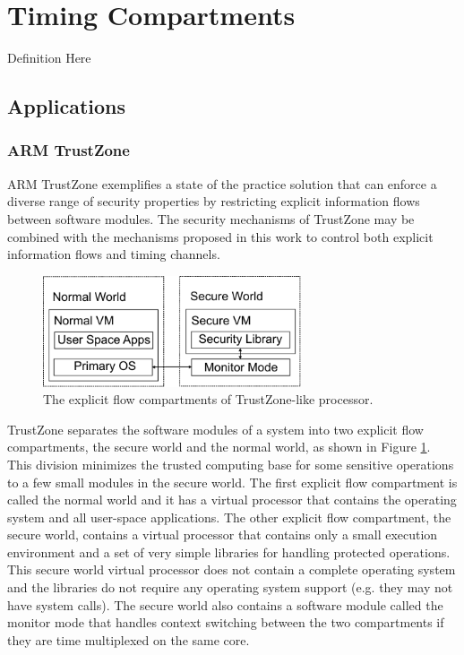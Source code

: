 \section{Timing Compartments}
    Definition Here
    \subsection{ Applications }
    \subsubsection{ARM TrustZone}
    ARM TrustZone exemplifies a state of the practice solution that can enforce 
    a diverse range of security properties by restricting explicit information 
    flows between software modules. The security mechanisms of TrustZone may be 
    combined with the mechanisms proposed in this work to control both explicit 
    information flows and timing channels.

    \begin{figure}
        \begin{center}
            \includegraphics[width=3in]{figs/worlds.pdf}
            \caption{The explicit flow compartments of TrustZone-like 
            processor.}
            \label{fig:tz_domains}
        \end{center}
    \end{figure}

    TrustZone separates the software modules of a system into two explicit flow 
    compartments, the secure world and the normal world, as shown in Figure 
    \ref{fig:tz_domains}.
    This division minimizes the trusted computing base for some sensitive
    operations to a few small modules in the secure world.
    The first explicit flow compartment is called the normal world and it has a 
    virtual processor that contains the operating system and all user-space 
    applications. The other explicit flow compartment, the secure world, 
    contains a virtual processor that contains only a small execution 
    environment and a set of very simple libraries for handling protected 
    operations. This secure world virtual processor does not contain a complete 
    operating system and the libraries do not require any operating system 
    support (e.g. they may not have system calls). The secure world also 
    contains a software module called the monitor mode that handles context switching 
    between the two compartments if they are time multiplexed on the same core.

